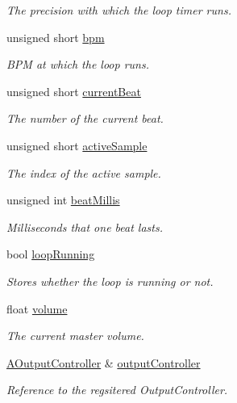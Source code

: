 \begin{DoxyCompactItemize}
\begin{DoxyCompactList}\small\item\em The precision with which the loop timer runs. \end{DoxyCompactList}\item 
unsigned short \hyperlink{class_drum_machine_afaa80be4a66f759ab590a5f67f327b67}{bpm}
\begin{DoxyCompactList}\small\item\em B\+PM at which the loop runs. \end{DoxyCompactList}\item 
unsigned short \hyperlink{class_drum_machine_a46f20be98c71d1429a473e03bf092df3}{current\+Beat}
\begin{DoxyCompactList}\small\item\em The number of the current beat. \end{DoxyCompactList}\item 
unsigned short \hyperlink{class_drum_machine_a9e12916e5724251791689e6f14c8513a}{active\+Sample}
\begin{DoxyCompactList}\small\item\em The index of the active sample. \end{DoxyCompactList}\item 
unsigned int \hyperlink{class_drum_machine_a91179ac48de4159d04052291ad25fa02}{beat\+Millis}
\begin{DoxyCompactList}\small\item\em Milliseconds that one beat lasts. \end{DoxyCompactList}\item 
bool \hyperlink{class_drum_machine_a4ac5a8c113e5a32a557f069e8d93cca8}{loop\+Running}
\begin{DoxyCompactList}\small\item\em Stores whether the loop is running or not. \end{DoxyCompactList}\item 
float \hyperlink{class_drum_machine_af1401c2a8e1d016ec32c662968e581fd}{volume}
\begin{DoxyCompactList}\small\item\em The current master volume. \end{DoxyCompactList}\item 
\hyperlink{class_a_output_controller}{A\+Output\+Controller} \& \hyperlink{class_drum_machine_a4a5b4d6cc6e4a3ce2c2893e52fd0e951}{output\+Controller}
\begin{DoxyCompactList}\small\item\em Reference to the regsitered Output\+Controller. \end{DoxyCompactList}\item 

\end{DoxyCompactItemize}
